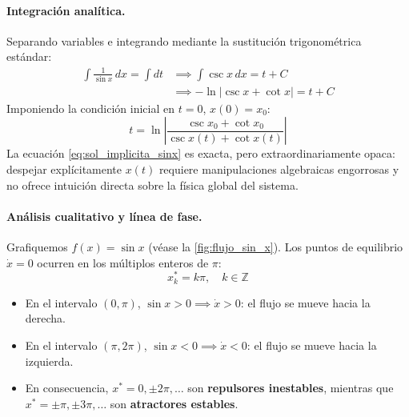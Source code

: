 \paragraph{Integración analítica.}
Separando variables e integrando mediante la sustitución trigonométrica estándar:
\begin{align}
    \int \frac{1}{\sin x} \, dx = \int dt &\implies \int \csc x \, dx = t + C \nonumber \\
    &\implies -\ln|\csc x + \cot x| = t + C
\end{align}
Imponiendo la condición inicial en $t=0$, $x(0) = x_0$:
\begin{equation}
    t = \ln \left| \frac{\csc x_0 + \cot x_0}{\csc x(t) + \cot x(t)} \right|
    \label{eq:sol_implicita_sinx}
\end{equation}
La ecuación \eqref{eq:sol_implicita_sinx} es exacta, pero extraordinariamente opaca: despejar explícitamente $x(t)$ requiere manipulaciones algebraicas engorrosas y no ofrece intuición directa sobre la física global del sistema.

\paragraph{Análisis cualitativo y línea de fase.}
Grafiquemos $f(x) = \sin x$ (véase la \cref{fig:flujo_sin_x}). Los puntos de equilibrio $\dot{x} = 0$ ocurren en los múltiplos enteros de $\pi$:
\begin{equation}
    x_k^* = k\pi, \quad k \in \mathbb{Z}
\end{equation}

\begin{itemize}
    \item En el intervalo $(0, \pi)$, $\sin x > 0 \implies \dot{x} > 0$: el flujo se mueve hacia la derecha.
    \item En el intervalo $(\pi, 2\pi)$, $\sin x < 0 \implies \dot{x} < 0$: el flujo se mueve hacia la izquierda.
    \item En consecuencia, $x^* = 0, \pm 2\pi, \dots$ son \textbf{repulsores inestables}, mientras que $x^* = \pm \pi, \pm 3\pi, \dots$ son \textbf{atractores estables}.
\end{itemize}

